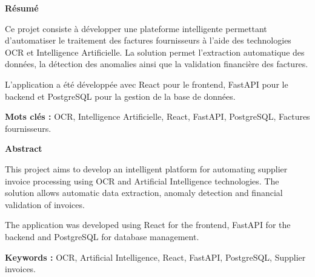 \begin{center}
	\textbf{\Large Résumé}
\end{center}

\vspace{0.5cm}

\begin{tcolorbox}[colback=gray!5,colframe=black]
	
	Ce projet consiste à développer une plateforme intelligente permettant d’automatiser le traitement des factures fournisseurs à l’aide des technologies OCR et Intelligence Artificielle. La solution permet l’extraction automatique des données, la détection des anomalies ainsi que la validation financière des factures.
	
	L’application a été développée avec React pour le frontend, FastAPI pour le backend et PostgreSQL pour la gestion de la base de données.
	
	\vspace{0.3cm}
	
	\textbf{Mots clés :} OCR, Intelligence Artificielle, React, FastAPI, PostgreSQL, Factures fournisseurs.
	
\end{tcolorbox}

\vspace{1cm}

\begin{center}
	\textbf{\Large Abstract}
\end{center}

\vspace{0.5cm}

\begin{tcolorbox}[colback=gray!5,colframe=black]
	
	This project aims to develop an intelligent platform for automating supplier invoice processing using OCR and Artificial Intelligence technologies. The solution allows automatic data extraction, anomaly detection and financial validation of invoices.
	
	The application was developed using React for the frontend, FastAPI for the backend and PostgreSQL for database management.
	
	\vspace{0.3cm}
	
	\textbf{Keywords :} OCR, Artificial Intelligence, React, FastAPI, PostgreSQL, Supplier invoices.
	
\end{tcolorbox}